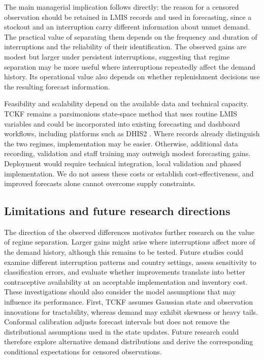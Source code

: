 \documentclass[
  11pt,
  authoryear,
  doubleblind,
  3p]{elsarticle}
\begin{document}
The main managerial implication follows directly: the reason for a
censored observation should be retained in LMIS records and used in
forecasting, since a stockout and an interruption carry different
information about unmet demand. The practical value of separating them
depends on the frequency and duration of interruptions and the
reliability of their identification. The observed gains are modest but
larger under persistent interruptions, suggesting that regime separation
may be more useful where interruptions repeatedly affect the demand
history. Its operational value also depends on whether replenishment
decisions use the resulting forecast information.

Feasibility and scalability depend on the available data and technical
capacity. TCKF remains a parsimonious state-space method that uses
routine LMIS variables and could be incorporated into existing
forecasting and dashboard workflows, including platforms such as DHIS2
\citep{DHIS2_DigitalHealthWeek2024}. Where records already distinguish
the two regimes, implementation may be easier. Otherwise, additional
data recording, validation and staff training may outweigh modest
forecasting gains. Deployment would require technical integration, local
validation and phased implementation. We do not assess these costs or
establish cost-effectiveness, and improved forecasts alone cannot
overcome supply constraints.

\subsection{Limitations and future research
directions}\label{limitations-and-future-research-directions}

The direction of the observed differences motivates further research on
the value of regime separation. Larger gains might arise where
interruptions affect more of the demand history, although this remains
to be tested. Future studies could examine different interruption
patterns and country settings, assess sensitivity to classification
errors, and evaluate whether improvements translate into better
contraceptive availability at an acceptable implementation and inventory
cost. These investigations should also consider the model assumptions
that may influence its performance. First, TCKF assumes Gaussian state
and observation innovations for tractability, whereas demand may exhibit
skewness or heavy tails. Conformal calibration adjusts forecast
intervals but does not remove the distributional assumptions used in the
state updates. Future research could therefore explore alternative
demand distributions and derive the corresponding conditional
expectations for censored observations.
\end{document}
